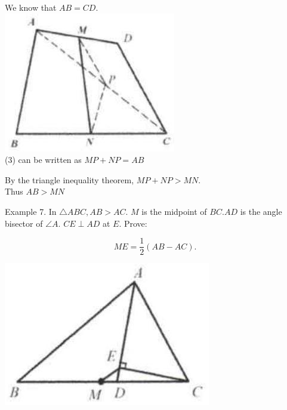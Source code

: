 \documentclass[10pt]{article}
\begin{document}
We know that \(A B=C D\).\\
\includegraphics[max width=\textwidth, center]{2025_04_17_97bc1f7e44d93c271a88g-038(3)}\\
(3) can be written as \(M P+N P=A B\)

By the triangle inequality theorem, \(M P+N P>M N\).\\
Thus \(A B>M N\)

Example 7. In \(\triangle A B C, A B>A C\). \(M\) is the midpoint of \(B C . A D\) is the angle bisector of \(\angle A\). \(C E \perp A D\) at \(E\). Prove:

\[
M E=\frac{1}{2}(A B-A C) .
\]

\begin{center}
\includegraphics[max width=\textwidth]{2025_04_17_97bc1f7e44d93c271a88g-038(2)}
\end{center}
\end{document}
